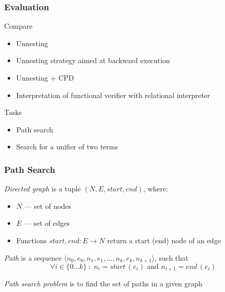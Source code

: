 \documentclass[xcolor=table]{beamer}
\begin{document}
\begin{frame}[fragile]
  \transwipe[direction=90]
  \frametitle{Evaluation}
  Compare

\begin{itemize}
  \item Unnesting
  \item Unnesting strategy aimed at backward execution
  \item Unnesting + CPD
  \item Interpretation of functional verifier with relational interpreter
\end{itemize}

Tasks

\begin{itemize}
  \item Path search
  \item Search for a unifier of two terms
\end{itemize}

\end{frame}

\begin{frame}[fragile]
  \transwipe[direction=90]
  \frametitle{Path Search}

\emph{Directed graph} is a tuple $(N, E, start, end)$, where:

\begin{itemize}
	\item $N$ --- set of nodes
	\item $E$ --- set of edges
	\item Functions $start, end: E \rightarrow N$ return a start (end) node of an edge
\end{itemize}

\pause
\vspace{10pt}

\emph{Path} is a sequence $\langle n_0, e_0, n_1, e_1, \dots, n_k, e_k, n_{k+1} \rangle$, such that
\[
\forall i \in \{ 0 \dots k \}\; :\; n_i = start\,(e_i) \text{ and } n_{i+1} = end\,(e_i)
\]

\vspace{10pt}

\pause
\emph{Path search problem} is to find the set of paths in a given graph

\end{frame}
\end{document}
